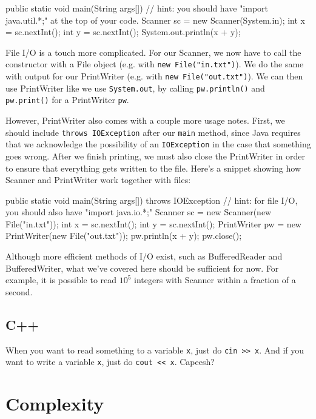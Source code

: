 \begin{mylstlisting}
public static void main(String args[]) {
  // hint: you should have "import java.util.*;" at the top of your code.
  Scanner sc = new Scanner(System.in);
  int x = sc.nextInt();
  int y = sc.nextInt();
  System.out.println(x + y);
}
\end{mylstlisting}

File I/O is a touch more complicated. For our Scanner, we now have to call the constructor with a File object (e.g. with \texttt{new File("in.txt")}). We do the same with output for our PrintWriter (e.g. with \texttt{new File("out.txt")}). We can then use PrintWriter like we use \texttt{System.out}, by calling \texttt{pw.println()} and \texttt{pw.print()} for a PrintWriter \texttt{pw}.

However, PrintWriter also comes with a couple more usage notes. First, we should include \texttt{throws IOException} after our \texttt{main} method, since Java requires that we acknowledge the possibility of an \texttt{IOException} in the case that something goes wrong. After we finish printing, we must also close the PrintWriter in order to ensure that everything gets written to the file. Here's a snippet showing how Scanner and PrintWriter work together with files: 

\begin{mylstlisting}
public static void main(String args[]) throws IOException {
  // hint: for file I/O, you should also have "import java.io.*;"
  Scanner sc = new Scanner(new File("in.txt"));
  int x = sc.nextInt();
  int y = sc.nextInt();
  PrintWriter pw = new PrintWriter(new File("out.txt"));
  pw.println(x + y);
  pw.close();
}
\end{mylstlisting}

Although more efficient methods of I/O exist, such as BufferedReader and BufferedWriter, what we've covered here should be sufficient for now. For example, it is possible to read $10^5$ integers with Scanner within a fraction of a second.

\subsection{C++}

When you want to read something to a variable \texttt{x}, just do \verb+cin >> x+. And if you want to write a variable \texttt{x}, just do \verb+cout << x+. Capeesh?

\section{Complexity}

